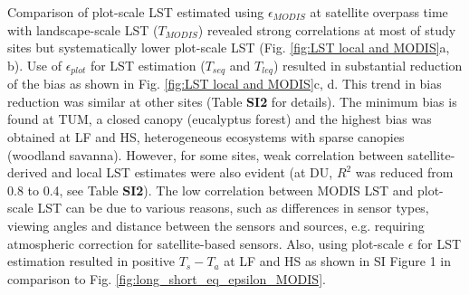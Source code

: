 \documentclass[fleqn,10pt]{wlscirep}
\begin{document}
Comparison of plot-scale LST estimated using $\epsilon_{MODIS}$ at satellite overpass time with landscape-scale LST ($T_{MODIS}$) revealed strong correlations at most of study sites but systematically lower plot-scale LST (Fig. \ref{fig:LST local and MODIS}a, b). Use  of $\epsilon_{plot}$ for LST estimation ($T_{seq}$ and $T_{leq}$) resulted in substantial reduction of the bias as shown in Fig. \ref{fig:LST local and MODIS}c, d. This trend in bias reduction was similar at other sites (Table \textbf{SI2} for details). The  minimum bias is found  at TUM, a closed canopy (eucalyptus forest) and the highest bias was obtained at LF and HS, heterogeneous ecosystems with sparse canopies (woodland savanna). However, for some sites, weak correlation between satellite-derived and local LST estimates were also evident (at DU, $R^2$ was reduced from 0.8 to 0.4, see Table \textbf{SI2}). The low correlation between MODIS LST and plot-scale LST can be due to various reasons, such as differences in sensor types, viewing angles and distance between the sensors and sources, e.g. requiring atmospheric correction for satellite-based sensors. Also, using plot-scale $\epsilon$ for LST estimation resulted in positive $T_{s} - T_{a}$ at LF and HS as shown in SI Figure 1 in comparison to Fig. \ref{fig:long_short_eq_epsilon_MODIS}.  
\end{document}
